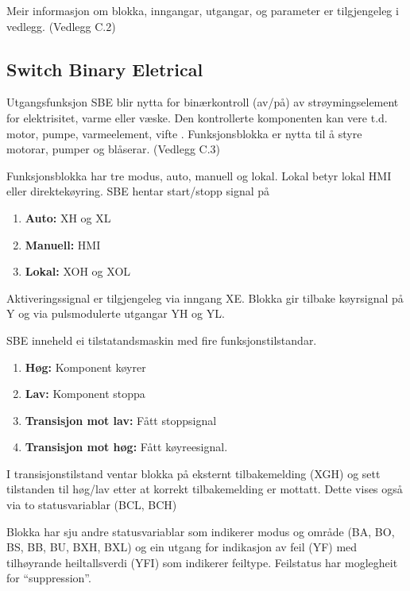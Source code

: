 Meir informasjon om blokka, inngangar, utgangar, og parameter er tilgjengeleg i vedlegg. (Vedlegg C.2)

\newpage

\subsection{Switch Binary Eletrical} 

Utgangsfunksjon \gls{SBE} blir nytta for binærkontroll (av/på) av strøymingselement for elektrisitet, varme eller væske. 
Den kontrollerte komponenten kan vere t.d. motor, pumpe, varmeelement, vifte \citep{IEC-63131}. \newline
Funksjonsblokka er nytta til å styre motorar, pumper og blåserar. (Vedlegg C.3)

Funksjonsblokka har tre modus, auto, manuell og lokal. Lokal betyr lokal HMI eller direktekøyring.
\gls{SBE} hentar start/stopp signal på
\begin{enumerate}
    \item \textbf{Auto:}        XH og XL  
    \item \textbf{Manuell:}     HMI
    \item \textbf{Lokal:}       XOH og XOL
\end{enumerate}
Aktiveringssignal er tilgjengeleg via inngang XE. \newline
Blokka gir tilbake køyrsignal på Y og via pulsmodulerte utgangar YH og YL.

\gls{SBE} inneheld ei tilstatandsmaskin med fire funksjonstilstandar. 
\begin{enumerate}
    \item \textbf{Høg:}                 Komponent køyrer
    \item \textbf{Lav:}                 Komponent stoppa
    \item \textbf{Transisjon mot lav:}  Fått stoppsignal
    \item \textbf{Transisjon mot høg:}  Fått køyreesignal.
\end{enumerate}

I transisjonstilstand ventar blokka på eksternt tilbakemelding (XGH) 
og sett tilstanden til høg/lav etter at korrekt tilbakemelding er mottatt.
Dette vises også via to statusvariablar (BCL, BCH)

Blokka har sju andre statusvariablar som indikerer modus og område (BA, BO, BS, BB, BU, BXH, BXL) og
ein utgang for indikasjon av feil (YF) med tilhøyrande heiltallsverdi (YFI) som indikerer feiltype. \newline
Feilstatus har moglegheit for ``suppression''.

